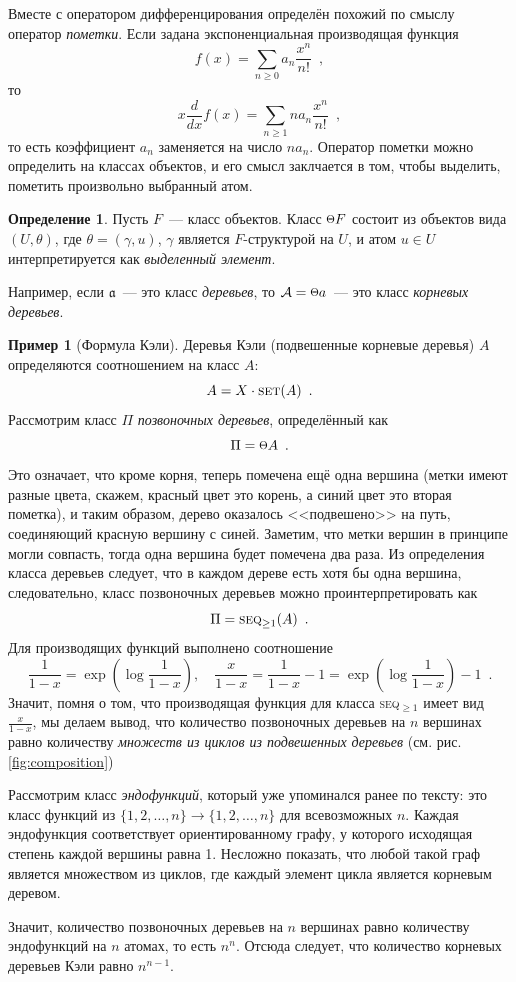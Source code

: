 \documentclass{article}
\def \point {\raisebox{.1\height}{\scalebox{0.8}{$\Theta$}}}
\theoremstyle{definition}
\newtheorem{example}{Пример}
\newtheorem*{definition}{Определение}
\begin{document}
Вместе с оператором дифференцирования определён похожий по смыслу оператор
\textit{пометки}. Если задана экспоненциальная производящая функция
\[
    f(x) = \sum_{n \geq 0} a_n \dfrac{x^n}{n!} \enspace ,
\]
то
\[
    x \dfrac{d}{dx} f(x) = \sum_{n \geq 1} n a_n \dfrac{x^n}{n!} \enspace ,
\]
то есть коэффициент \( a_n \) заменяется на число \( n a_n \). Оператор пометки
можно определить на классах объектов, и его смысл заклчается в том, чтобы
выделить, пометить произвольно выбранный атом.
\begin{definition}
    Пусть \( F \)~--- класс объектов. Класс \( \point F \) состоит из объектов
вида \( (U, \theta) \), где \( \theta = (\gamma, u) \), \( \gamma \) является \(
F \)-структурой на \( U \), и атом \(u \in U \) интерпретируется как
\textit{выделенный элемент}.
\end{definition}

Например, если \( \mathfrak a \)~--- это класс \textit{деревьев}, то \(\mathcal A =
\point a \)~--- это класс \textit{корневых деревьев}.

\begin{example}[Формула Кэли]
    Деревья Кэли (подвешенные корневые деревья) \( A \) определяются соотношением на класс \( A \):
\[
    A = X \cdot \text{\textsc{set}}(A) \enspace .
\]
Рассмотрим класс \( \Pi \) \textit{позвоночных деревьев}, определённый как
\[
    \Pi = \point A \enspace . 
\]
Это означает, что кроме корня, теперь помечена ещё одна вершина 
(метки имеют разные цвета, скажем, красный цвет это корень, а синий цвет это
вторая пометка), и таким образом, дерево
оказалось <<подвешено>> на путь, соединяющий красную вершину с синей. Заметим,
что метки вершин в принципе могли совпасть, тогда одна вершина будет помечена
два раза. Из
определения класса деревьев следует, что в каждом дереве есть хотя бы одна
вершина, следовательно, класс позвоночных деревьев можно проинтерпретировать как
\[
    \Pi = \text{\textsc{seq}}_{\geq 1} (A) \enspace .
\]
Для производящих функций выполнено соотношение
\[
    \dfrac{1}{1-x} = \exp \left(
        \log \dfrac{1}{1 - x}
    \right), \quad
    \dfrac{x}{1-x} = \dfrac{1}{1 -x} - 1 =  \exp \left(
        \log \dfrac{1}{1 - x}
    \right) - 1 \enspace .
\]
Значит, помня о том, что производящая функция для класса \textsc{seq}$_{\geq 1}$
имеет вид \(\frac{x}{1-x}\), мы делаем вывод, что количество позвоночных
деревьев на \( n \) вершинах равно количеству \textit{множеств из циклов из
подвешенных деревьев} (см. рис. \ref{fig:composition})

Рассмотрим класс \textit{эндофункций}, который уже упоминался ранее по тексту:
это класс функций из \( \{ 1, 2, \ldots, n \} \to \{1, 2, \ldots, n\} \) для
всевозможных \( n \). Каждая эндофункция соответствует ориентированному графу, у
которого исходящая степень каждой вершины равна 1. Несложно показать, что любой
такой граф является множеством из циклов, где каждый элемент цикла является
корневым деревом.

Значит, количество позвоночных деревьев на \( n \) вершинах равно количеству
эндофункций на \( n \) атомах, то есть \( n^n \). Отсюда следует, что количество корневых деревьев
Кэли равно \( n^{n-1} \).
\end{example}
\end{document}
